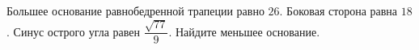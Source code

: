 \begin{ex}
	\begin{condition}
		Большее основание равнобедренной трапеции равно \( 26 \). Боковая сторона равна \( 18 \). Синус острого угла равен \( \dfrac{\sqrt{77}}{9} \).  Найдите меньшее основание.
	\end{condition}
\end{ex}